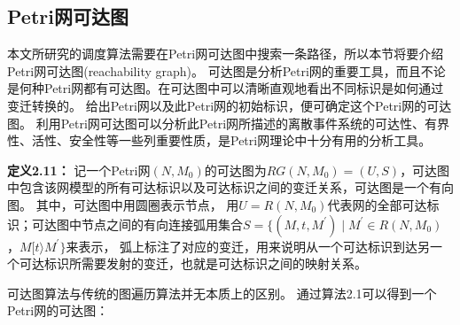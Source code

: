     \subsection{Petri网可达图}
    本文所研究的调度算法需要在Petri网可达图中搜索一条路径，所以本节将要介绍Petri网可达图(reachability graph)。
    可达图是分析Petri网的重要工具，而且不论是何种Petri网都有可达图。在可达图中可以清晰直观地看出不同标识是如何通过变迁转换的。
    给出Petri网以及此Petri网的初始标识，便可确定这个Petri网的可达图。
    利用Petri网可达图可以分析此Petri网所描述的离散事件系统的可达性、有界性、活性、安全性等一些列重要性质，是Petri网理论中十分有用的分析工具。

    \textbf{定义2.11}\cite{li2009deadlock}\textbf{：}
    记一个Petri网$(N, M_{0})$的可达图为$RG(N, M_{0})= (U, S)$，可达图中包含该网模型的所有可达标识以及可达标识之间的变迁关系，可达图是一个有向图。
    其中，可达图中用圆圈表示节点，
    用$U= R(N, M_{0})$代表网的全部可达标识；可达图中节点之间的有向连接弧用集合$S= \{(M, t, M^{\prime})\mid M^{\prime} \in R(N, M_{0})$，$M[t\rangle M^{\prime}\}$来表示，
    弧上标注了对应的变迁，用来说明从一个可达标识到达另一个可达标识所需要发射的变迁，也就是可达标识之间的映射关系。

    可达图算法与传统的图遍历算法并无本质上的区别。
    通过算法2.1\cite{zby2019}可以得到一个Petri网的可达图：

